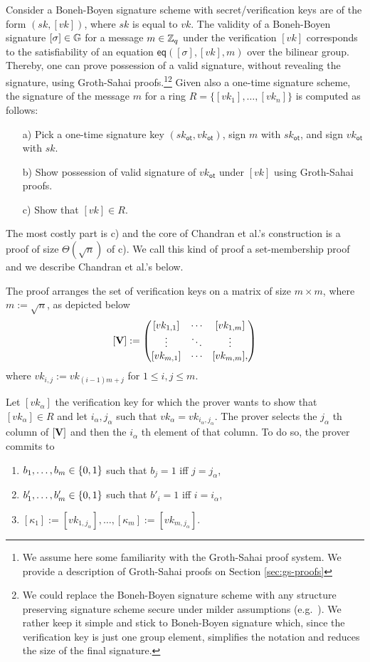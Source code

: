 Consider a {Boneh-Boyen signature scheme} \cite{EC:BonBoy04a} with secret/verification keys are of the form $(sk,[vk])$, where $sk$ is equal to $vk$. The validity of a Boneh-Boyen signature $[\sigma]\in\mathbb{G}$ for a message $m\in\mathbb{Z}_q$ under the verification $[vk]$ corresponds to the satisfiability of an equation $\mathsf{eq}([\sigma],[vk],m)$ over the bilinear group. Thereby, one can prove possession of a valid signature, without revealing the signature, using Groth-Sahai proofs.\cite{EC:GroSah08}\footnote{We assume here some familiarity with the Groth-Sahai proof system. We provide a description of Groth-Sahai proofs on Section \ref{sec:gs-proofs}}\footnote{We could replace the Boneh-Boyen signature scheme with any structure preserving signature scheme secure under milder assumptions (e.g.~\cite{EPRINT:JutRoy17}). We rather keep it simple and stick to Boneh-Boyen signature which, since the verification key is just one group element, simplifies the notation and reduces the size of the final signature.}  Given also a {one-time signature scheme}, the signature of the message $m$ for a ring $R=\{[vk_1],\ldots,[vk_n]\}$ is computed as follows:
\begin{itemize}
	\item[a)] Pick a one-time signature key $(sk_\mathsf{ot},vk_\mathsf{ot})$, sign $m$ with $sk_\mathsf{ot}$, and sign $vk_\mathsf{ot}$ with $sk$.
	\item[b)] Show possession of valid signature of $vk_\mathsf{ot}$ under $[vk]$ using Groth-Sahai proofs.
	\item[c)] Show that $[vk]\in R$.
\end{itemize}
The most costly part is c) and the core of Chandran et al.'s construction is a proof of size $\Theta(\sqrt{n})$ of c). We call this kind of proof a set-membership proof and we describe Chandran et al.'s below.
 
The proof arranges the set of verification keys on a matrix of size $m\times m$, where $m:=\sqrt{n}$, as depicted below
$$
[\mathbf{{V}}]:=
\begin{pmatrix}
[vk_{1,1}] & \cdots & [vk_{1,m}]\\
\vdots     & \ddots & \vdots \\
[vk_{m,1}]  & \cdots & [vk_{m,m}],
\end{pmatrix}
$$
where $vk_{i,j}:=vk_{(i-1)m+j}$ for $1\leq i,j \leq m$.

Let $[vk_\alpha]$ the verification key for which the prover wants to show that $[vk_\alpha]\in R$ and let $i_\alpha,j_\alpha$ such that $vk_\alpha = vk_{i_\alpha,j_\alpha}$. The prover selects the $j_\alpha$ th column of $[\mathbf{{V}}]$ and then the $i_\alpha$ th element of that column. To do so, the prover commits to 
\begin{enumerate}
\item $b_1,\ldots,b_m\in\{0,1\}$ such that $b_j=1$ iff $j=j_\alpha$,
\item $b'_1,\ldots,b'_m\in\{0,1\}$ such that $b'_i=1$ iff $i=i_\alpha$,
\item $[\kappa_1]:=[vk_{1,j_\alpha}],\ldots,[\kappa_m]:=[vk_{m,j_\alpha}]$.
\end{enumerate}

